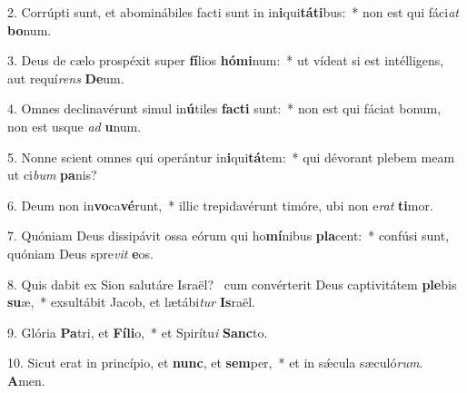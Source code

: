 2. Corrúpti sunt, et abominábiles facti sunt in in\textbf{i}qui\textbf{tá}\textbf{ti}bus:~*  non est qui fáci\textit{at} \textbf{bo}num.\

3. Deus de cælo prospéxit super \textbf{fí}lios \textbf{hó}\textbf{mi}num:~*  ut vídeat si est intélligens, aut requí\textit{rens} \textbf{De}um.\

4. Omnes declinavérunt simul in\textbf{ú}tiles \textbf{fac}\textbf{ti} sunt:~*  non est qui fáciat bonum, non est usque \textit{ad} \textbf{u}num.\

5. Nonne scient omnes qui operántur in\textbf{i}qui\textbf{tá}tem:~*  qui dévorant plebem meam ut ci\textit{bum} \textbf{pa}nis?\

6. Deum non in\textbf{vo}ca\textbf{vé}runt,~*  illic trepidavérunt timóre, ubi non e\textit{rat} \textbf{ti}mor.\

7. Quóniam Deus dissipávit ossa eórum qui ho\textbf{mí}nibus \textbf{pla}cent:~*  confúsi sunt, quóniam Deus spre\textit{vit} \textbf{e}os.\

8. Quis dabit ex Sion salutáre Israël? \dag\  cum convérterit Deus captivitátem \textbf{ple}bis \textbf{su}æ,~*  exsultábit Jacob, et lætábi\textit{tur} \textbf{Is}raël.\

9. Glória \textbf{Pa}tri, et \textbf{Fí}\textbf{li}o,~*  et Spirítu\textit{i} \textbf{Sanc}to.\

10. Sicut erat in princípio, et \textbf{nunc}, et \textbf{sem}per,~*  et in sǽcula sæculó\textit{rum}. \textbf{A}men.\

